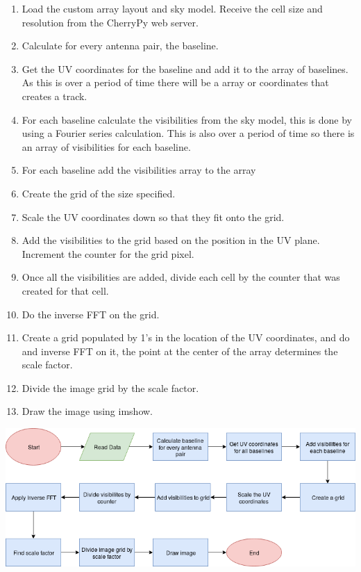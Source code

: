 \begin{enumerate}
    \item Load the custom array layout and sky model. Receive the cell size and resolution from the CherryPy web server.
    \item Calculate for every antenna pair, the baseline.
    \item Get the UV coordinates for the baseline and add it to the array of baselines. As this is over a period of time there will be a array or coordinates that creates a track.
    \item For each baseline calculate the visibilities from the sky model, this is done by using a Fourier series calculation. This is also over a period of time so there is an array of visibilities for each baseline.
    \item For each baseline add the visibilities array to the array
    \item Create the grid of the size specified.
    \item Scale the UV coordinates down so that they fit onto the grid.
    \item Add the visibilities to the grid based on the position in the UV plane. Increment the counter for the grid pixel.
    \item Once all the visibilities are added, divide each cell by the counter that was created for that cell.
    \item Do the inverse FFT on the grid.
    \item Create a grid populated by 1's in the location of the UV coordinates, and do and inverse FFT on it, the point at the center of the array determines the scale factor. 
    \item Divide the image grid by the scale factor.
    \item Draw the image using imshow.
\end{enumerate}
\begin{center}
    \includegraphics[scale=0.5]{images/FlowDiagram.png}
\end{center}{}
